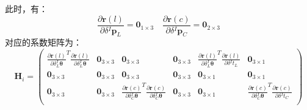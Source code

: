 此时，有：
\begin{equation}
  \frac{\partial \boldsymbol{r}(l)}{\partial \delta {^{I}\boldsymbol{p}_L}}=\boldsymbol{0}_{1\times 3}
  \quad
  \frac{\partial \boldsymbol{r}(c)}{\partial \delta {^{I}\boldsymbol{p}_C}}=\boldsymbol{0}_{2\times 3}
\end{equation}
对应的系数矩阵为：
\begin{equation}
  \boldsymbol{H}_i=\begin{pmatrix}
    \frac{\partial \boldsymbol{r}(l)}{\partial \delta {^{I}_{L}\boldsymbol{\theta}}}^T
     \frac{\partial \boldsymbol{r}(l)}{\partial \delta {^{I}_{L}\boldsymbol{\theta}}} &
    \boldsymbol{0}_{3\times 3}                                                             &
    \boldsymbol{0}_{3\times 3}                                                             &
    \boldsymbol{0}_{3\times 3}                                                             &
    \frac{\partial \boldsymbol{r}(l)}{\partial \delta {^{I}_{L}\boldsymbol{\theta}}}^T
     \frac{\partial \boldsymbol{r}(l)}{\partial \delta {^{I}t_{L}}}                   &
    \boldsymbol{0}_{3\times 1}                                                               \\
    \boldsymbol{0}_{3\times 3}                                                             &
    \boldsymbol{0}_{3\times 3}                                                             &
    \boldsymbol{0}_{3\times 3}                                                             &
    \boldsymbol{0}_{3\times 3}                                                             &
    \boldsymbol{0}_{3\times 1}                                                             &
    \boldsymbol{0}_{3\times 1}                                                               \\
    \boldsymbol{0}_{3\times 3}                                                             &
    \boldsymbol{0}_{3\times 3}                                                             &
    \frac{\partial \boldsymbol{r}(c)}{\partial \delta {^{I}_{C}\boldsymbol{\theta}}}^T
     \frac{\partial \boldsymbol{r}(c)}{\partial \delta {^{I}_{C}\boldsymbol{\theta}}} &
    \boldsymbol{0}_{3\times 3}                                                             &
    \boldsymbol{0}_{3\times 1}                                                             &
    \frac{\partial \boldsymbol{r}(c)}{\partial \delta {^{I}_{C}\boldsymbol{\theta}}}^T
     \frac{\partial \boldsymbol{r}(c)}{\partial \delta {^{I}t_{C}}}                     \\

\end{pmatrix}
\end{equation}
